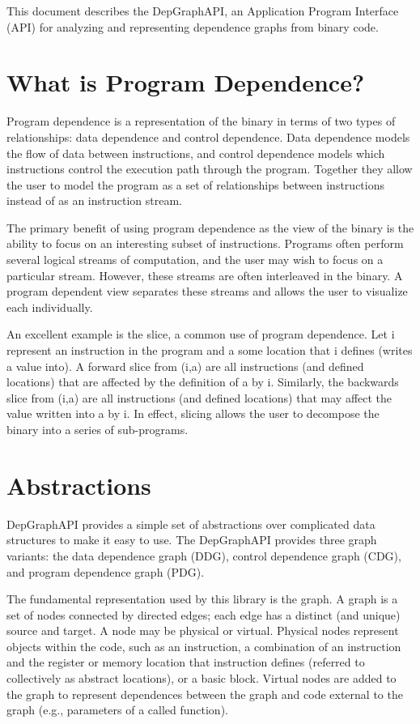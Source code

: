 \documentclass[12pt,titlepage]{article}
\begin{document}
This document describes the DepGraphAPI, an Application Program
Interface (API) for analyzing and representing dependence graphs from
binary code.

\section{What is Program Dependence?}

Program dependence is a representation of the binary in terms of two
types of relationships: data dependence and control dependence. Data
dependence models the flow of data between instructions, and control
dependence models which instructions control the execution path
through the program. Together they allow the user to model the program
as a set of relationships between instructions instead of as an
instruction stream.  

The primary benefit of using program dependence as the view of the
binary is the ability to focus on an interesting subset of
instructions. Programs often perform several logical streams of
computation, and the user may wish to focus on a particular
stream. However, these streams are often interleaved in the binary. A
program dependent view separates these streams and allows the user to
visualize each individually.

An excellent example is the slice, a common use of program
dependence. Let i represent an instruction in the program and a some
location that i defines (writes a value into). A forward slice from
(i,a) are all instructions (and defined locations) that are affected
by the definition of a by i. Similarly, the backwards slice from (i,a)
are all instructions (and defined locations) that may affect the value
written into a by i. In effect, slicing allows the user to decompose
the binary into a series of sub-programs.  

\section{Abstractions}

DepGraphAPI provides a simple set of abstractions over complicated
data structures to make it easy to use. The DepGraphAPI provides three
graph variants: the data dependence graph (DDG), control dependence
graph (CDG), and program dependence graph (PDG).

The fundamental representation used by this library is the graph. A
graph is a set of nodes connected by directed edges; each edge has a
distinct (and unique) source and target. A node may be physical or
virtual. Physical nodes represent objects within the code, such as an
instruction, a combination of an instruction and the register or
memory location that instruction defines (referred to collectively as
abstract locations), or a basic block. Virtual nodes are added to the
graph to represent dependences between the graph and code external to
the graph (e.g., parameters of a called function).
\end{document}
